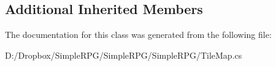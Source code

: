 \subsection*{Additional Inherited Members}


The documentation for this class was generated from the following file\+:\begin{DoxyCompactItemize}
\item 
D\+:/\+Dropbox/\+Simple\+R\+P\+G/\+Simple\+R\+P\+G/\+Simple\+R\+P\+G/Tile\+Map.\+cs\end{DoxyCompactItemize}
